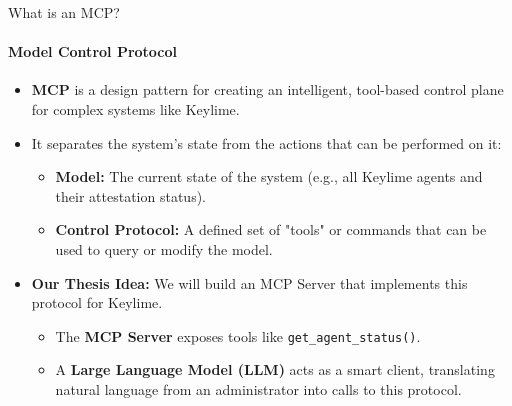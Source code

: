 \documentclass{beamer}
\begin{document}
\begin{frame}{What is an MCP?}
    \framesubtitle{Model Control Protocol}
    \begin{itemize}
        \item \textbf{MCP} is a design pattern for creating an intelligent, tool-based control plane for complex systems like Keylime.
        \vspace{1em}
        \item It separates the system's state from the actions that can be performed on it:
        \begin{itemize}
            \item \textbf{Model:} The current state of the system (e.g., all Keylime agents and their attestation status).
            \item \textbf{Control Protocol:} A defined set of "tools" or commands that can be used to query or modify the model.
        \end{itemize}
        \vspace{1em}
        \item \textbf{Our Thesis Idea:} We will build an MCP Server that implements this protocol for Keylime.
        \begin{itemize}
            \item The \textbf{MCP Server} exposes tools like \texttt{get\_agent\_status()}.
            \item A \textbf{Large Language Model (LLM)} acts as a smart client, translating natural language from an administrator into calls to this protocol.
        \end{itemize}
    \end{itemize}
\end{frame}
\end{document}
